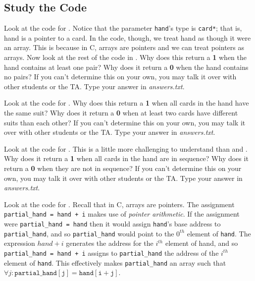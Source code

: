 \subsection{Study the Code}
\label{StudyTheCode}

Look at the code for . Notice that the parameter
\lstinline{hand}'s type is \lstinline{card*}; that is, \lstinline{}{hand} is a
pointer to a \lstinline{}{card}. In the code, though, we treat
\lstinline{}{hand} as though it were an array. This is because in C, arrays are
pointers and we can treat pointers as arrays. Now look at the rest of the code
in . Why does this return a \textbf{1} when the hand
contains at least one pair?  Why does it return a \textbf{0} when the hand
contains no pairs?  If you can't determine this on your own, you may talk it
over with other students or the TA. Type your answer in \textit{answers.txt}.

Look at the code for . Why does this return a \textbf{1}
when all cards in the hand have the same suit?  Why does it return a \textbf{0}
when at least two cards have different suits than each other?  If you can't
determine this on your own, you may talk it over with other students or the TA.
Type your answer in \textit{answers.txt}.

Look at the code for . This is a little more challenging
to understand than  and . Why does it
return a \textbf{1} when all cards in the hand are in sequence?  Why does it
return a \textbf{0} when they are not in sequence? If you can't determine this
on your own, you may talk it over with other students or the TA. Type your
answer in \textit{answers.txt}.

Look at the code for . Recall that in C, arrays are
pointers. The assignment \lstinline{partial_hand = hand + i} makes use of
\textit{pointer arithmetic}. If the assignment were
\lstinline{partial_hand = hand} then it would assign \lstinline{hand}'s base
address to \lstinline{partial_hand}, and so \lstinline{partial_hand} would point
to the $0^{th}$ element of \lstinline{hand}. The expression $hand+i$ generates
the address for the $i^{th}$ element of \lstinline{}{hand}, and so
\lstinline{partial_hand = hand + i} assigns to \lstinline{partial_hand} the
address of the $i^{th}$ element of \lstinline{hand}. This effectively makes
\lstinline{partial_hand} an array such that
$\forall j : \mathtt{partial\_hand[j] = hand[i+j]}$.

